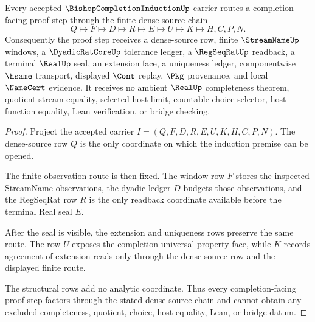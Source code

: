 \begin{theorem}
\label{thm:bishop-completion-induction-dense-source-route}
Every accepted $\BishopCompletionInductionUp$ carrier routes a completion-facing proof step through the finite dense-source chain
$$
Q \longmapsto F \longmapsto D \longmapsto R \longmapsto E \longmapsto U \longmapsto K \longmapsto H,C,P,N .
$$
Consequently the proof step receives a dense-source row, finite $\StreamNameUp$ windows, a $\DyadicRatCoreUp$ tolerance ledger, a $\RegSeqRatUp$ readback, a terminal $\RealUp$ seal, an extension face, a uniqueness ledger, componentwise $\hsame$ transport, displayed $\Cont$ replay, $\Pkg$ provenance, and local $\NameCert$ evidence. It receives no ambient $\RealUp$ completeness theorem, quotient stream equality, selected host limit, countable-choice selector, host function equality, Lean verification, or bridge checking.
\end{theorem}
\begin{proof}
Project the accepted carrier $I=(Q,F,D,R,E,U,K,H,C,P,N)$. The dense-source row $Q$ is the only coordinate on which the induction premise can be opened.

The finite observation route is then fixed. The window row $F$ stores the inspected StreamName observations, the dyadic ledger $D$ budgets those observations, and the RegSeqRat row $R$ is the only readback coordinate available before the terminal Real seal $E$.

After the seal is visible, the extension and uniqueness rows preserve the same route. The row $U$ exposes the completion universal-property face, while $K$ records agreement of extension reads only through the dense-source row and the displayed finite route.

The structural rows add no analytic coordinate. Thus every completion-facing proof step factors through the stated dense-source chain and cannot obtain any excluded completeness, quotient, choice, host-equality, Lean, or bridge datum.
\end{proof}

